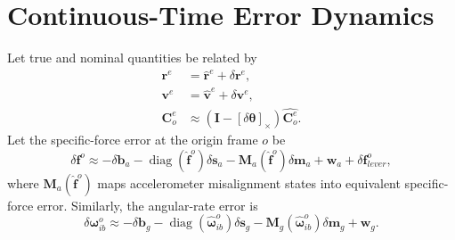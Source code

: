 \documentclass[11pt,oneside]{book}
\renewcommand{\skew}[1]{\left[#1\right]_{\times}}
\newcommand{\vb}{\mathbf{v}}
\newcommand{\rb}{\mathbf{r}}
\newcommand{\bb}{\mathbf{b}}
\newcommand{\fb}{\mathbf{f}}
\newcommand{\I}{\mathbf{I}}
\newcommand{\Coe}{\mathbf{C}^{e}_{o}}
\begin{document}
\section{Continuous-Time Error Dynamics}
Let true and nominal quantities be related by
\begin{align}
\rb^e &= \hat{\rb}^e+\delta\rb^e,\\
\vb^e &= \hat{\vb}^e+\delta\vb^e,\\
\Coe &\approx \left(\I-\skew{\delta\boldsymbol\theta}\right)\hat{\Coe}.
\end{align}
Let the specific-force error at the origin frame $o$ be
\begin{equation}
\delta\fb^o
\approx
-\delta\bb_a
-\operatorname{diag}(\hat{\fb}^o)\delta\mathbf{s}_a
-\mathbf{M}_a(\hat{\fb}^o)\delta\mathbf{m}_a
+\mathbf{w}_a
+\delta\fb_{lever}^o,
\label{eq:specific_force_error_model_rev2}
\end{equation}
where $\mathbf{M}_a(\hat{\fb}^o)$ maps accelerometer misalignment states into equivalent specific-force error. Similarly, the angular-rate error is
\begin{equation}
\delta\boldsymbol\omega_{ib}^o
\approx
-\delta\bb_g
-\operatorname{diag}(\hat{\boldsymbol\omega}_{ib}^o)\delta\mathbf{s}_g
-\mathbf{M}_g(\hat{\boldsymbol\omega}_{ib}^o)\delta\mathbf{m}_g
+\mathbf{w}_g.
\label{eq:gyro_error_model_rev2}
\end{equation}
\end{document}
